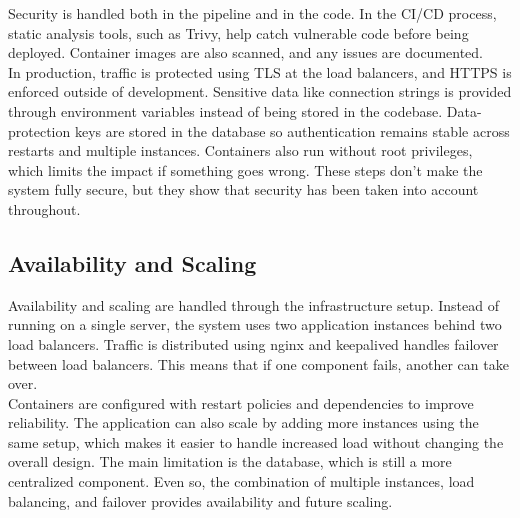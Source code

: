 Security is handled both in the pipeline and in the code. In the CI/CD process, static analysis tools, such as Trivy, help catch vulnerable code before being deployed. Container images are also scanned, and any issues are documented.
\\
In production, traffic is protected using TLS at the load balancers, and HTTPS is enforced outside of development. Sensitive data like connection strings is provided through environment variables instead of being stored in the codebase. Data-protection keys are stored in the database so authentication remains stable across restarts and multiple instances. Containers also run without root privileges, which limits the impact if something goes wrong. These steps don’t make the system fully secure, but they show that security has been taken into account throughout.

\subsection{Availability and Scaling}

Availability and scaling are handled through the infrastructure setup. Instead of running on a single server, the system uses two application instances behind two load balancers. Traffic is distributed using nginx and keepalived handles failover between load balancers. This means that if one component fails, another can take over.
\\
Containers are configured with restart policies and dependencies to improve reliability. The application can also scale by adding more instances using the same setup, which makes it easier to handle increased load without changing the overall design. The main limitation is the database, which is still a more centralized component. Even so, the combination of multiple instances, load balancing, and failover provides availability and future scaling.


